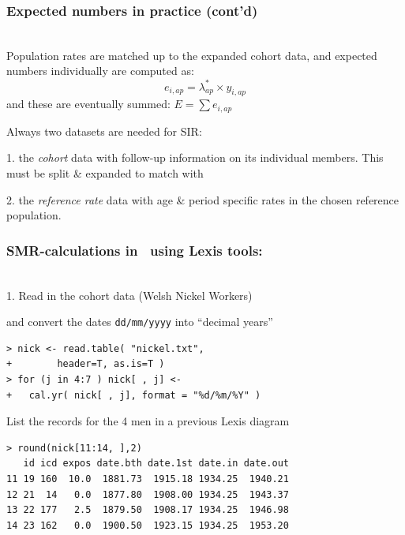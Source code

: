 \documentclass[handout,12pt]{beamer}
\begin{document}
\begin{frame}
\frametitle{Expected numbers in practice (cont'd)} 
\ \\

 Population rates are matched up 
to the expanded cohort data, and
  expected numbers individually are computed as:
$$ e_{i,ap} = \lambda_{ap}^* \times y_{i,ap}  $$
and these are eventually summed: $E = \sum e_{i,ap}$

\bigskip
Always two datasets are needed for SIR:
\bi
\item[1.]
 the \textit{cohort} data with follow-up information on its
  individual members. This must be split \& expanded to match with
\item[2.] the \textit{reference rate} data with age \& period specific rates in the chosen reference population.
\ei

\end{frame}



\begin{frame}[fragile]
 \frametitle{SMR-calculations in \R \ using Lexis tools:} 
 
 \ \\
{\large \color{blue} 
  1. Read in the cohort data (Welsh Nickel Workers) }
  
  \medskip
 and  convert the dates \texttt{dd/mm/yyyy} into ``decimal years'' 
{\small
\renewcommand{\baselinestretch}{0.9}
\begin{verbatim}
> nick <- read.table( "nickel.txt", 
+        header=T, as.is=T )
> for (j in 4:7 ) nick[ , j] <-
+   cal.yr( nick[ , j], format = "%d/%m/%Y" )
\end{verbatim}
}
List the records for the 4 men in a previous Lexis diagram
{\small
\begin{verbatim}
> round(nick[11:14, ],2)
   id icd expos date.bth date.1st date.in date.out
11 19 160  10.0  1881.73  1915.18 1934.25  1940.21
12 21  14   0.0  1877.80  1908.00 1934.25  1943.37
13 22 177   2.5  1879.50  1908.17 1934.25  1946.98
14 23 162   0.0  1900.50  1923.15 1934.25  1953.20
\end{verbatim}
}

\end{frame}
\end{document}
